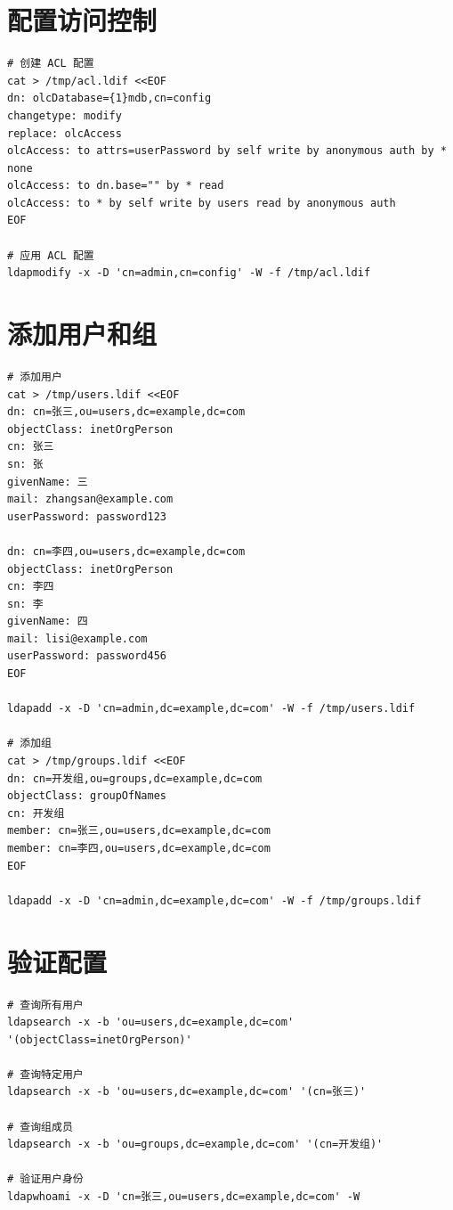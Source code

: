 \documentclass[12pt,UTF8]{ctexbook}
\begin{document}
\section{配置访问控制}
\label{sec:practice_acl}

\begin{verbatim}
# 创建 ACL 配置
cat > /tmp/acl.ldif <<EOF
dn: olcDatabase={1}mdb,cn=config
changetype: modify
replace: olcAccess
olcAccess: to attrs=userPassword by self write by anonymous auth by * none
olcAccess: to dn.base="" by * read
olcAccess: to * by self write by users read by anonymous auth
EOF

# 应用 ACL 配置
ldapmodify -x -D 'cn=admin,cn=config' -W -f /tmp/acl.ldif
\end{verbatim}

\section{添加用户和组}
\label{sec:practice_users_groups}

\begin{verbatim}
# 添加用户
cat > /tmp/users.ldif <<EOF
dn: cn=张三,ou=users,dc=example,dc=com
objectClass: inetOrgPerson
cn: 张三
sn: 张
givenName: 三
mail: zhangsan@example.com
userPassword: password123

dn: cn=李四,ou=users,dc=example,dc=com
objectClass: inetOrgPerson
cn: 李四
sn: 李
givenName: 四
mail: lisi@example.com
userPassword: password456
EOF

ldapadd -x -D 'cn=admin,dc=example,dc=com' -W -f /tmp/users.ldif

# 添加组
cat > /tmp/groups.ldif <<EOF
dn: cn=开发组,ou=groups,dc=example,dc=com
objectClass: groupOfNames
cn: 开发组
member: cn=张三,ou=users,dc=example,dc=com
member: cn=李四,ou=users,dc=example,dc=com
EOF

ldapadd -x -D 'cn=admin,dc=example,dc=com' -W -f /tmp/groups.ldif
\end{verbatim}

\section{验证配置}
\label{sec:practice_verify}

\begin{verbatim}
# 查询所有用户
ldapsearch -x -b 'ou=users,dc=example,dc=com' '(objectClass=inetOrgPerson)'

# 查询特定用户
ldapsearch -x -b 'ou=users,dc=example,dc=com' '(cn=张三)'

# 查询组成员
ldapsearch -x -b 'ou=groups,dc=example,dc=com' '(cn=开发组)'

# 验证用户身份
ldapwhoami -x -D 'cn=张三,ou=users,dc=example,dc=com' -W
\end{verbatim}

\backmatter
\end{document}

